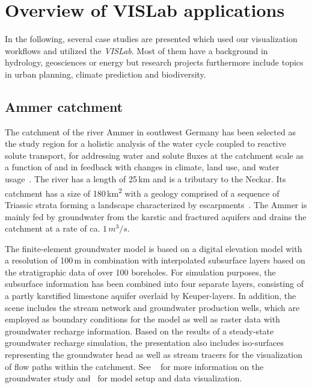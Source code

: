 \documentclass[twocolumn]{svjour3}          %
\begin{document}
\section{Overview of VISLab applications}
\label{overview-of-VISLab-applications}

In the following, several case studies are presented which used our visualization workflows and utilized the \emph{VISLab}. Most of them have a background in hydrology, geosciences or energy but research projects furthermore include topics in urban planning, climate prediction and biodiversity.

\subsection{Ammer catchment}
\label{ammer-catchment}

The catchment of the river Ammer in southwest Germany has been selected as the study region for a holistic analysis of the water cycle coupled to reactive solute transport, for addressing water and solute fluxes at the catchment scale as a function of and in feedback with changes in climate, land use, and water usage~\cite{grathwohl:wessti}. The river has a length of 25\,km and is a tributary to the Neckar. Its catchment has a size of 180\,km\textsuperscript{2} with a geology comprised of a sequence of Triassic strata forming a landscape characterized by escarpments~\cite{selle:wessti}. The Ammer is mainly fed by groundwater from the karstic and fractured aquifers and drains the catchment at a rate of ca. $1\,m^3/s$.

The finite-element groundwater model is based on a digital elevation model with a resolution of 100\,m in combination with interpolated subsurface layers based on the stratigraphic data of over 100 boreholes. For simulation purposes, the subsurface information has been combined into four separate layers, consisting of a part\-ly karstified limestone aquifer overlaid by Keuper-layers. In addition, the scene includes the stream network and groundwater production wells, which are employed as boundary conditions for the model as well as raster data with groundwater recharge information. Based on the results of a steady-state groundwater recharge simulation, the presentation also includes iso-surfaces representing the groundwater head as well as stream tracers for the visualization of flow paths within the catchment. See ~\cite{selle:wessti} for more information on the groundwater study and~\cite{rink:wessti} for model setup and data visualization.
\end{document}
